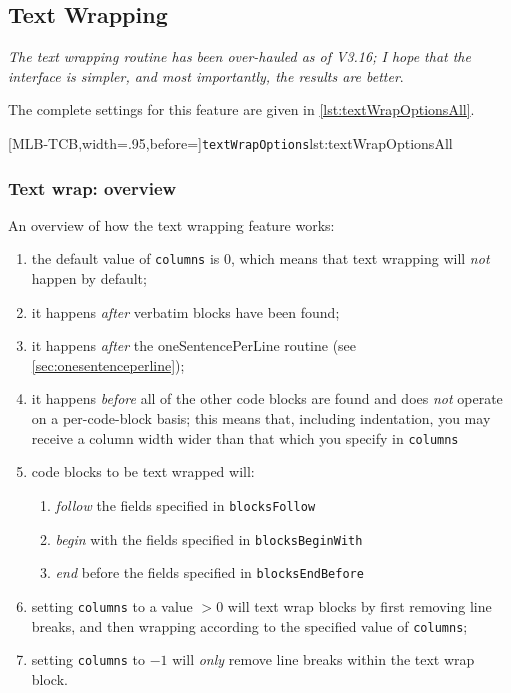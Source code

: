 \subsection{Text Wrapping}\label{subsec:textwrapping}
 \emph{The text wrapping routine has been over-hauled as
 of V3.16; I hope that the interface is simpler, and most importantly, the results are
 better}.

 The complete settings for this feature are given in \cref{lst:textWrapOptionsAll}.

 [MLB-TCB,width=.95\linewidth,before=\centering]{\texttt{textWrapOptions}}{lst:textWrapOptionsAll}

\subsubsection{Text wrap: overview}
 An overview of how the text wrapping feature works:
 \begin{enumerate}
  \item the default value of \texttt{columns} is 0, which means that text wrapping will
        \emph{not} happen by default;
  \item it happens \emph{after} verbatim blocks have been found;
  \item it happens \emph{after} the oneSentencePerLine routine (see
        \cref{sec:onesentenceperline});
  \item it happens \emph{before} all of the other code blocks are found and does \emph{not}
        operate on a per-code-block basis; this means that, including indentation, you may
        receive a column width wider than that which you specify in \texttt{columns}
  \item code blocks to be text wrapped will:
        \begin{enumerate}
         \item \emph{follow} the fields specified in \texttt{blocksFollow}
         \item \emph{begin} with the fields specified in \texttt{blocksBeginWith}
         \item \emph{end} before the fields specified in \texttt{blocksEndBefore}
        \end{enumerate}
  \item setting \texttt{columns} to a value $>0$ will text wrap blocks by first removing line
        breaks, and then wrapping according to the specified value of \texttt{columns};
  \item setting \texttt{columns} to $-1$ will \emph{only} remove line breaks within the text wrap
        block.
 \end{enumerate}

